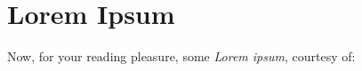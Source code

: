 \chapter{Lorem Ipsum}
\label{chap:ch4_abbr}
Now, for your reading pleasure, some \textsl{Lorem ipsum}, courtesy
of:
